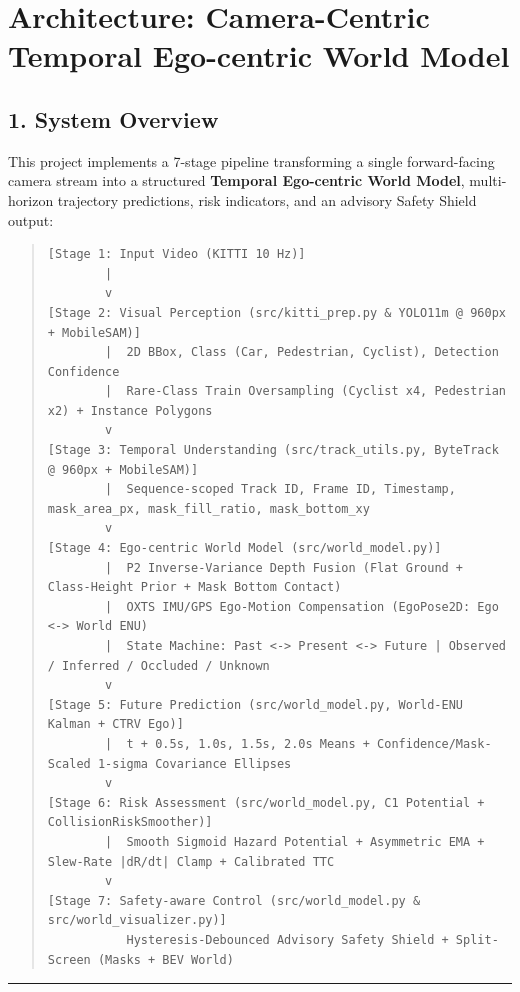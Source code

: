 \documentclass[10.5pt,a4paper]{article}
\begin{document}
\section{Architecture: Camera-Centric Temporal Ego-centric World Model}

\subsection{1. System Overview}

This project implements a 7-stage pipeline transforming a single forward-facing camera stream into a structured \textbf{Temporal Ego-centric World Model}, multi-horizon trajectory predictions, risk indicators, and an advisory Safety Shield output:


\begin{quote}\begin{footnotesize}\begin{verbatim}
[Stage 1: Input Video (KITTI 10 Hz)]
        |
        v
[Stage 2: Visual Perception (src/kitti_prep.py & YOLO11m @ 960px + MobileSAM)]
        |  2D BBox, Class (Car, Pedestrian, Cyclist), Detection Confidence
        |  Rare-Class Train Oversampling (Cyclist x4, Pedestrian x2) + Instance Polygons
        v
[Stage 3: Temporal Understanding (src/track_utils.py, ByteTrack @ 960px + MobileSAM)]
        |  Sequence-scoped Track ID, Frame ID, Timestamp, mask_area_px, mask_fill_ratio, mask_bottom_xy
        v
[Stage 4: Ego-centric World Model (src/world_model.py)]
        |  P2 Inverse-Variance Depth Fusion (Flat Ground + Class-Height Prior + Mask Bottom Contact)
        |  OXTS IMU/GPS Ego-Motion Compensation (EgoPose2D: Ego <-> World ENU)
        |  State Machine: Past <-> Present <-> Future | Observed / Inferred / Occluded / Unknown
        v
[Stage 5: Future Prediction (src/world_model.py, World-ENU Kalman + CTRV Ego)]
        |  t + 0.5s, 1.0s, 1.5s, 2.0s Means + Confidence/Mask-Scaled 1-sigma Covariance Ellipses
        v
[Stage 6: Risk Assessment (src/world_model.py, C1 Potential + CollisionRiskSmoother)]
        |  Smooth Sigmoid Hazard Potential + Asymmetric EMA + Slew-Rate |dR/dt| Clamp + Calibrated TTC
        v
[Stage 7: Safety-aware Control (src/world_model.py & src/world_visualizer.py)]
           Hysteresis-Debounced Advisory Safety Shield + Split-Screen (Masks + BEV World)
\end{verbatim}\end{footnotesize}\end{quote}

\par\noindent\rule{\textwidth}{0.4pt}\par\medskip
\end{document}

